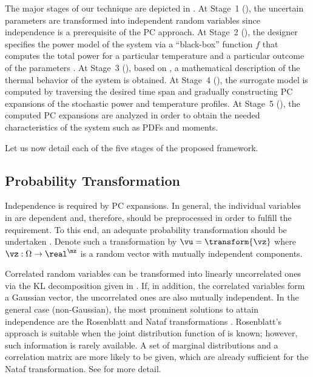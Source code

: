 The major stages of our technique are depicted in . At
Stage~1 (), the uncertain parameters \vu
are transformed into independent random variables \vz since independence is a
prerequisite of the \ac{PC} approach. At Stage~2 (), the
designer specifies the power model of the system via a ``black-box'' function
$f$ that computes the total power \vp for a particular temperature \vq and a
particular outcome of the parameters \vu. At Stage~3
(), based on , a
mathematical description of the thermal behavior of the system is obtained. At
Stage~4 (), the surrogate model is computed by
traversing the desired time span and gradually constructing \ac{PC} expansions
of the stochastic power and temperature profiles. At Stage~5
(), the computed \ac{PC} expansions are analyzed in
order to obtain the needed characteristics of the system such as \acp{PDF} and
moments.

Let us now detail each of the five stages of the proposed framework.

\subsection{Probability Transformation}

Independence is required by \ac{PC} expansions. In general, the \nu individual
variables in \vu are dependent and, therefore, should be preprocessed in order
to fulfill the requirement. To this end, an adequate probability transformation
should be undertaken \cite{eldred2008}. Denote such a transformation by $\vu =
\transform{\vz}$ where $\vz: \Omega \to \real^\nz$ is a random vector with \nz
mutually independent components.

Correlated random variables can be transformed into linearly uncorrelated ones
via the \ac{KL} decomposition given in . If, in addition,
the correlated variables form a Gaussian vector, the uncorrelated ones are also
mutually independent. In the general case (non-Gaussian), the most prominent
solutions to attain independence are the Rosenblatt \cite{rosenblatt1952} and
Nataf transformations \cite{liu1986}. Rosenblatt's approach is suitable when the
joint distribution function of \vu is known; however, such information is rarely
available. A set of marginal distributions and a correlation matrix are more
likely to be given, which are already sufficient for the Nataf transformation.
See  for more detail.

